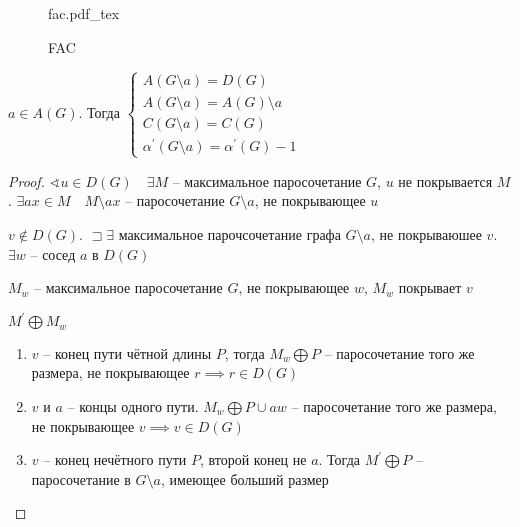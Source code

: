 \documentclass{book}
\newcommand{\p}[1]{#1^{\prime}}
\theoremstyle{definition}
\newcommand{\incfig}[1]{%
    \def\svgwidth{\columnwidth}
    {#1.pdf_tex}
}
\begin{document}
\begin{figure}[!ht]
    \centering
    \incfig{fac}
    \caption{FAC}
    \label{fig:fac}
\end{figure}

\begin{lemma}
    [О стабильности]

    $a\in A(G)$. Тогда  $\begin{cases}
        A(G\setminus a) = D(G)\\
        A(G\setminus a) = A\left(G \right) \setminus a\\
        C(G\setminus a) = C(G)\\
        \p\alpha(G\setminus a) = \p \alpha(G) - 1
    \end{cases}$
\end{lemma}
\begin{proof}
    $\sphericalangle u\in D(G)\quad \exists M$ -- максимальное паросочетание $G$,  $u$ не покрывается  $M$.  $\exists ax\in M\quad M\setminus ax$ -- паросочетание $G\setminus a$, не покрывающее $u$

    $v\not\in D(G)$. $\sqsupset \exists $ максимальное парочсочетание графа $G\setminus a$, не покрываюшее $v$. $\exists w$ -- сосед $a$ в  $D(G)$

    $M_{w}$ -- максимальное паросочетание $G$, не покрывающее $w$,  $M_w$ покрывает  $v$

     $\p M \bigoplus M_w$

      \begin{enumerate}
          \item $v$ -- конец пути чётной длины  $P$, тогда $M_w\bigoplus P$ -- паросочетание того же размера, не покрывающее  $r \implies  r\in D(G)$
          \item $v$ и  $a$ -- концы одного пути.  $M_w \bigoplus P \cup aw$ -- паросочетание того же размера, не покрывающее $v \implies v\in D(G)$
          \item $v$ -- конец нечётного пути  $P$, второй конец не  $a$. Тогда  $\p M \bigoplus P$ -- паросочетание в  $G\setminus a$, имеющее больший размер
     \end{enumerate}
\end{proof}
\end{document}
